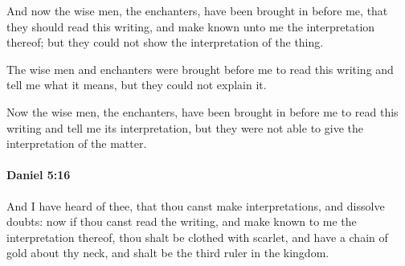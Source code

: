 			\begin{versebox}
					\item[BHS] 
					\item[ASV] And now the wise men, the enchanters, have been brought in before me, that they should read this writing, and make known unto me the interpretation thereof; but they could not show the interpretation of the thing.
					\item[NIV] The wise men and enchanters were brought before me to read this writing and tell me what it means, but they could not explain it.
					\item[NRSV] Now the wise men, the enchanters, have been brought in before me to read this writing and tell me its interpretation, but they were not able to give the interpretation of the matter.
			\end{versebox}

		\paragraph{Daniel 5:16} %
			\label{DANIEL-5-16}

			And I have heard of thee, that thou canst make interpretations, and dissolve doubts: now if thou canst read the writing, and make known to me the interpretation thereof, thou shalt be clothed with scarlet, and have a chain of gold about thy neck, and shalt be the third ruler in the kingdom.

